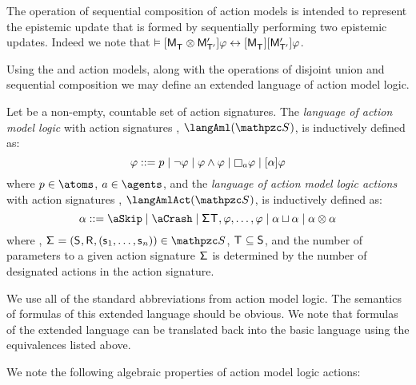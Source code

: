 The operation of sequential composition of action models is intended to represent the epistemic update that is formed by sequentially performing two epistemic updates.
Indeed we note that $\entails \actionA{\aPModel{\aStatesT} \compose \aPModelP{\aStatesTP}} \phi \iff \actionA{\aPModel{\aStatesT}} \actionA{\aPModelP{\aStatesTP}} \phi$.

Using the \aSkip{} and \aCrash{} action models, along with the operations of disjoint union and sequential composition we may define an extended language of action model logic.

\begin{definition}
Let \aSignatureFamily{} be a non-empty, countable set of action signatures.
The {\em language of action model logic} with action signatures \aSignatureFamily{}, $\langAml(\aSignatureFamily)$, is inductively defined as:
$$
\phi ::=
    \atomP \mid
    \lnot \phi \mid
    \phi \land \phi \mid
    \necessaryA \phi \mid
    \actionA{\alpha} \phi
$$
where $\atomP \in \atoms$, $\agentA \in \agents$, and the {\em language of action model logic actions} with action signatures \aSignatureFamily{}, $\langAmlAct(\aSignatureFamily)$, is inductively defined as:
$$
\alpha ::=
    \aSkip \mid
    \aCrash \mid
    \aSignature \aStatesT, \phi, \dots, \phi \mid
    \alpha \choice \alpha \mid
    \alpha \compose \alpha
$$
where , $\aSignatureAndTuple \in \aSignatureFamily$, $\aStatesT \subseteq \aStates$, and the number of parameters to a given action signature $\aSignature$ is determined by the number of designated actions in the action signature.
\end{definition}

We use all of the standard abbreviations from action model logic.
The semantics of formulas of this extended language should be obvious.
We note that formulas of the extended language can be translated back into the basic language using the equivalences listed above.

We note the following algebraic properties of action model logic actions:

